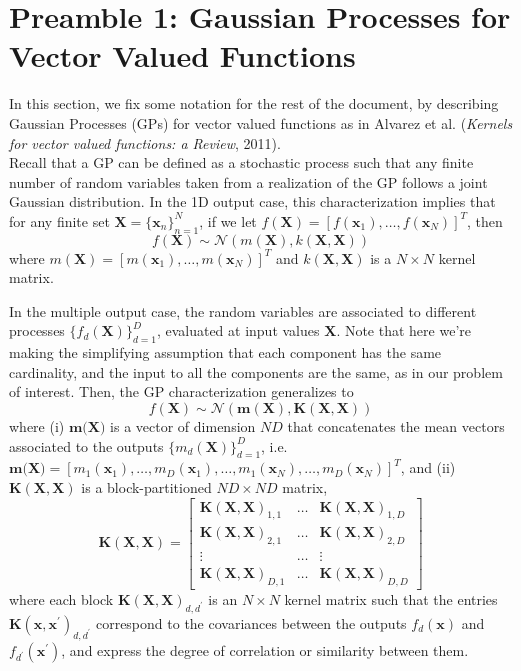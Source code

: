 \documentclass[11pt,a4paper]{article}
\begin{document}

\section*{Preamble 1: Gaussian Processes for Vector Valued Functions}
In this section, we fix some notation for the rest of the document, by describing Gaussian Processes (GPs) for vector valued functions as in Alvarez et al. (\textit{Kernels for vector valued functions: a Review}, 2011). \\

Recall that a GP can be defined as a stochastic process such that any finite number of random variables taken from a realization of the GP follows a joint Gaussian distribution. In the 1D output case, this characterization implies that for any finite set $\textbf{X} = \{\textbf{x}_n\}_{n=1}^N$, if we let $f(\textbf{X}) = [f(\textbf{x}_1), \ldots, f(\textbf{x}_N)]^T$, then 
$$
f(\textbf{X}) \sim \mathcal{N}(m(\textbf{X}), k(\textbf{X}, \textbf{X}))
$$
where $m(\textbf{X}) = [m(\textbf{x}_1), \ldots, m(\textbf{x}_N)]^T$ and $k(\textbf{X}, \textbf{X})$ is a $N \times N$ kernel matrix.

In the multiple output case, the random variables are associated to different processes $\{f_d(\textbf{X})\}_{d=1}^D$, evaluated at input values $\textbf{X}$. Note that here we're making the simplifying assumption that each component has the same cardinality, and the input to all the components are the same, as in our problem of interest. Then, the GP characterization generalizes to 
$$
f(\textbf{X}) \sim \mathcal{N}(\textbf{m}(\textbf{X}), \textbf{K}(\textbf{X}, \textbf{X}))
$$
where (i) $\textbf{m}(\textbf{X)}$ is a vector of dimension $ND$ that concatenates the mean vectors associated to the outputs $\{m_d(\textbf{X})\}_{d=1}^D$, i.e. $\textbf{m}(\textbf{X)} = [m_1(\textbf{x}_1), \ldots, m_D(\textbf{x}_1), \ldots, m_1(\textbf{x}_N), \ldots, m_D(\textbf{x}_N)]^T$, and (ii) $\textbf{K}(\textbf{X}, \textbf{X})$ is a block-partitioned $ND \times ND$ matrix,
$$
\textbf{K}(\textbf{X}, \textbf{X}) = 
\begin{bmatrix}
\textbf{K}(\textbf{X}, \textbf{X})_{1,1} & \ldots & \textbf{K}(\textbf{X}, \textbf{X})_{1,D} \\  \textbf{K}(\textbf{X}, \textbf{X})_{2,1} & \ldots & \textbf{K}(\textbf{X}, \textbf{X})_{2,D} \\
\vdots & \ldots & \vdots \\
\textbf{K}(\textbf{X}, \textbf{X})_{D,1} & \ldots & \textbf{K}(\textbf{X}, \textbf{X})_{D,D}
\end{bmatrix}
 $$
 where each block $\textbf{K}(\textbf{X}, \textbf{X})_{d,d^\prime}$ is an $N \times N$ kernel  matrix such that the entries $\textbf{K}(\textbf{x}, \textbf{x}^\prime)_{d,d^\prime}$ correspond to the covariances between the outputs $f_d(\textbf{x})$ and $f_{d^\prime}(\textbf{x}^\prime)$, and express the degree of correlation or similarity between them. \\
 
\end{document}
